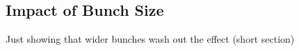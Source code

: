 \subsection{Impact of Bunch Size}
\label{bunch_size}

Just showing that wider bunches wash out the effect (short section)





